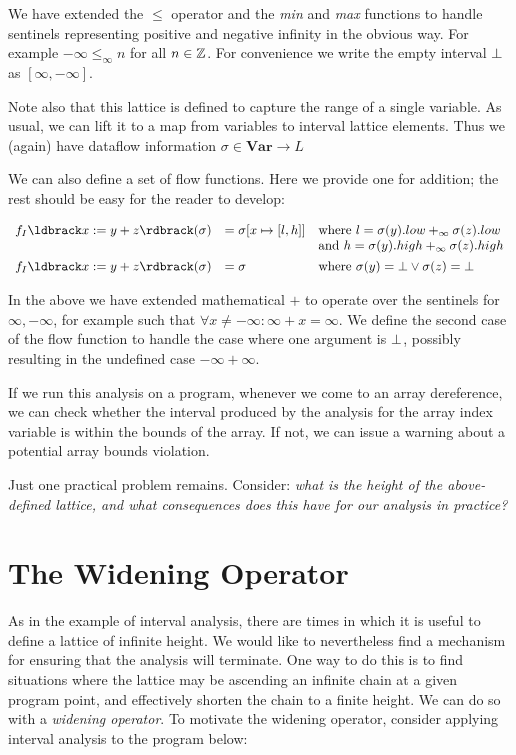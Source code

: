 \documentclass[11pt]{article}
\begin{document}
\noindent We have extended the $\le$ operator and the \textit{min} and
\textit{max} functions to handle sentinels representing positive and negative
infinity in the obvious way.  For example $-\infty \le_\infty n$ for all $n \in
\mathbb{Z}$.  For convenience we write the empty interval $\bot$ as
$[\infty,-\infty]$.

Note also that this lattice is defined to capture the range of a single
variable.  As usual, we can lift it to a map from variables to
interval lattice elements.  Thus we (again) have dataflow information $\sigma \in
\mathbf{Var} \rightarrow L$

We can also define a set of flow functions.  Here we provide one for addition;
the rest should be easy for the reader to develop:

\[
\begin{array}{lll}

f_I\parg{x := y + z}(\sigma) & = \sigma[x \mapsto [l,h]] & \mbox{where}~ l=\sigma(y).low +_\infty \sigma(z).low \\
& & \mbox{and}~ h=\sigma(y).high +_\infty \sigma(z).high \\[1ex]
f_I\parg{x := y + z}(\sigma) & = \sigma & \mbox{where}~ \sigma(y)=\bottom \lor \sigma(z) = \bottom \\

\end{array}
\]

In the above we have extended mathematical $+$ to operate over the sentinels for
$\infty,-\infty$, for example such that $ \forall x \ne -\infty : \infty+x =
\infty$.  We define the second case of the flow function to handle the case
where one argument is $\bot$, possibly resulting in the undefined case
$-\infty+\infty$.

If we run this analysis on a program, whenever we come to an array dereference,
we can check whether the interval produced by the analysis for the array index
variable is within the bounds of the array.  If not, we can issue a warning
about a potential array bounds violation.

Just one practical problem remains.  Consider: \emph{what is the height of the
  above-defined lattice, and what consequences does this have for our analysis
  in practice?}


\section{The Widening Operator}

As in the example of interval analysis, there are times in which it is useful to
define a lattice of infinite height.  We would like to nevertheless find a
mechanism for ensuring that the analysis will terminate.  One way to do this is
to find situations where the lattice may be ascending an infinite chain at a
given program point, and effectively shorten the chain to a finite height.  We
can do so with a \textit{widening operator}.
%
To motivate the widening operator, consider applying interval
analysis to the program below:
\end{document}
